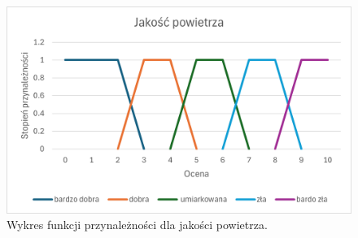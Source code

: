 \documentclass{article}
\begin{document}
\begin{enumerate}
    \begin{figure}[H]
    \centering
    \includegraphics[width=\textwidth]{img/air.png}
    \caption{Wykres funkcji przynależności dla jakości powietrza.}
    \end{figure}
\end{enumerate}
\end{document}
